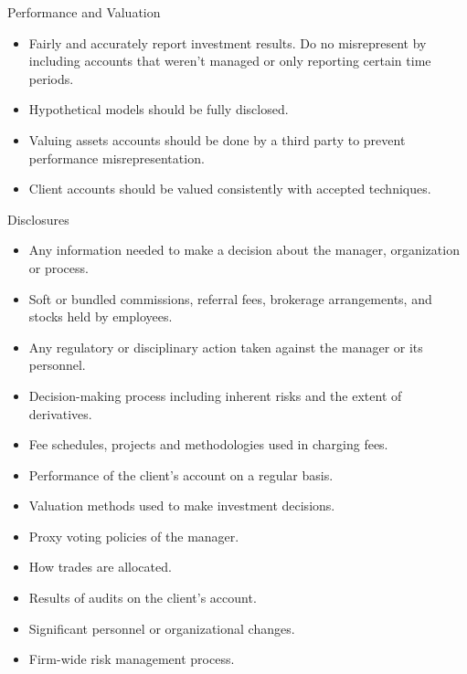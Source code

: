 \documentclass[../custom]{flashcards}
\begin{document}
\begin{flashcard}{Performance and Valuation}
    \begin{itemize}
        \item Fairly and accurately report investment results. Do no misrepresent by including accounts that weren't managed or only reporting certain time periods.
        \item Hypothetical models should be fully disclosed.
        \item Valuing assets accounts should be done by a third party to prevent performance misrepresentation.
        \item Client accounts should be valued consistently with accepted techniques.
    \end{itemize}
\end{flashcard}

\begin{flashcard}{Disclosures}
    \begin{itemize}
        \item Any information needed to make a decision about the manager, organization or process.
        \item Soft or bundled commissions, referral fees, brokerage arrangements, and stocks held by employees.
        \item Any regulatory or disciplinary action taken against the manager or its personnel.
        \item Decision-making process including inherent risks and the extent of derivatives.
        \item Fee schedules, projects and methodologies used in charging fees.
        \item Performance of the client's account on a regular basis.
        \item Valuation methods used to make investment decisions.
        \item Proxy voting policies of the manager.
        \item How trades are allocated.
        \item Results of audits on the client's account.
        \item Significant personnel or organizational changes.
        \item Firm-wide risk management process.
    \end{itemize}
\end{flashcard}
\end{document}
